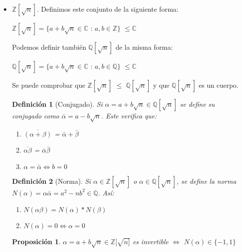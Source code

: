 \documentclass[11pt, a4paper, titlepage]{article}
\providecommand{\ent}{\mathbb{Z}}
\providecommand{\rac}{\mathbb{Q}}
\theoremstyle{theorem-style}
\newtheorem*{nprop}{Proposición}
\theoremstyle{definition-style}
\newtheorem*{ndef}{Definición}
\theoremstyle{remark-style}
\theoremstyle{example-style}
\begin{document}
\begin{itemize}
\item $\mathbb{Z}[\sqrt{n}]$.
Definimos este conjunto de la siguiente forma:
\begin{center}$\mathbb{Z}[\sqrt{n}] = \{a+b\sqrt{n} \in \mathbb{C}$ : $a,b \in \mathbb{Z} \}$ $\leq \mathbb{C}$\end{center}

Podemos definir también $\mathbb{Q}[\sqrt{n}]$ de la misma forma:

\begin{center}$\mathbb{Q}[\sqrt{n}] = \{a+b\sqrt{n} \in \mathbb{C}$ : $a,b \in \mathbb{Q} \}$ $\leq \mathbb{C}$\end{center}

Se puede comprobar que $\mathbb{Z}[\sqrt{n}]$ $\leq$ $\mathbb{Q}[\sqrt{n}]$ y que $\mathbb{Q}[\sqrt{n}]$ es un cuerpo.

\begin{ndef}[Conjugado]
	Si $\alpha = a+b\sqrt{n}\in \mathbb{Q}[\sqrt{n}]$ se define su conjugado como $\bar{\alpha} = a - b\sqrt{n}$. Este verifica que:
\begin{enumerate}

\item $ \overline{(\alpha+ \beta)} $ = $\bar{\alpha} + \bar{\beta}$
\item $\overline{\alpha \beta}$ = $\bar{\alpha}\bar{\beta}$
\item $\alpha = \bar{\alpha} \Leftrightarrow b = 0$
	
\end{enumerate} 
\end{ndef}

\begin{ndef}[Norma]
	Si $\alpha \in \mathbb{Z}[\sqrt{n}]$ o $\alpha \in \mathbb{Q}[\sqrt{n}]$, se define la norma $N(\alpha) = \alpha \bar{\alpha} = a^2 - nb^2 \in \rac $. Así:
\begin{enumerate}
	\item $N(\alpha \beta) = N(\alpha) * N(\beta)$
	\item $N(\alpha) = 0 \iff \alpha = 0$
\end{enumerate}
\end{ndef}


\begin{nprop}
	$\alpha = a + b \sqrt{n} \in \ent[\sqrt{n]}$ es invertible $\iff$ $N(\alpha) \in \{-1,1\}$
\end{nprop}

\end{itemize}
\end{document}
